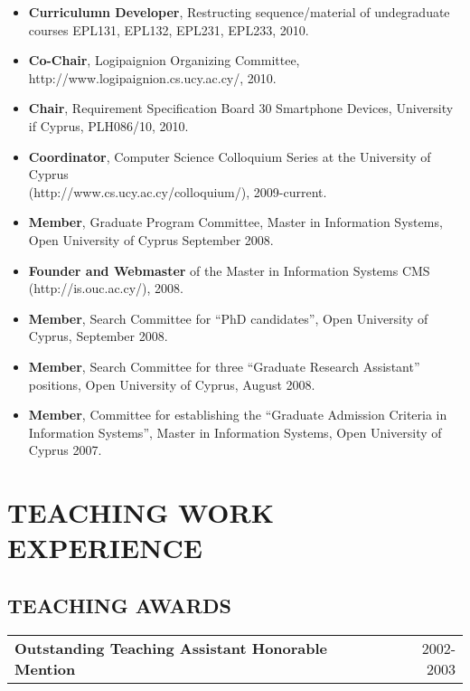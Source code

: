 \documentclass[10pt]{article}
\begin{document}
\begin{itemize}
   \item {\bf Curriculumn Developer}, Restructing sequence/material of undegraduate courses EPL131, EPL132, EPL231, EPL233, 2010.
   \item {\bf Co-Chair}, Logipaignion Organizing Committee, http://www.logipaignion.cs.ucy.ac.cy/, 2010.
   \item {\bf Chair}, Requirement Specification Board 30 Smartphone Devices, University if Cyprus, PLH086/10, 2010.
   \item {\bf Coordinator}, Computer Science Colloquium Series  at the University of Cyprus \\ (http://www.cs.ucy.ac.cy/colloquium/), 2009-current.
   \item {\bf Member}, Graduate Program Committee, Master in Information Systems, Open University of Cyprus September 2008.   
   \item {\bf Founder and Webmaster} of the Master in Information Systems CMS (http://is.ouc.ac.cy/), 2008.
   \item {\bf Member}, Search Committee for ``PhD candidates'', Open University of Cyprus, September 2008.
   \item {\bf Member}, Search Committee for three ``Graduate Research Assistant'' positions, Open University of Cyprus, August 2008.
   \item {\bf Member}, Committee for establishing the ``Graduate Admission Criteria in Information Systems'', Master in Information Systems, Open University of Cyprus 2007.
   

\end{itemize}		


\newpage


\section{\bf TEACHING WORK EXPERIENCE}

\subsection*{TEACHING AWARDS}
\begin{center}  %
\begin{tabular*}{1.0\textwidth}%
	{@{\extracolsep{\fill}}lr}
{\bf  Outstanding Teaching Assistant Honorable Mention} 	&  	 2002-2003	\\
\end{tabular*}
\end{center}
\end{document}
